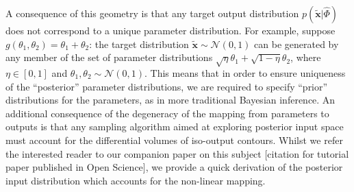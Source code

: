 \documentclass[10pt,letterpaper]{article}
\begin{document}
A consequence of this geometry is that any target output distribution $p(\tilde{\boldsymbol{x}}|\hat{\Phi})$ does not correspond to a unique parameter distribution. For example, suppose $g(\theta_1, \theta_2) = \theta_1 + \theta_2$: the target distribution $\tilde{\boldsymbol{x}}\sim \mathcal{N}(0, 1)$ can be generated by any member of the set of parameter distributions $\sqrt{\eta} \theta_1 + \sqrt{1 - \eta} \theta_2$, where $\eta\in [0, 1]$ and $\theta_1, \theta_2 \sim \mathcal{N}(0, 1)$. This means that in order to ensure uniqueness of the ``posterior'' parameter distributions, we are required to specify ``prior'' distributions for the parameters, as in more traditional Bayesian inference. An additional consequence of the degeneracy of the mapping from parameters to outputs is that any sampling algorithm aimed at exploring posterior input space must account for the differential volumes of iso-output contours. Whilst we refer the interested reader to our companion paper on this subject [citation for tutorial paper published in Open Science], we provide a quick derivation of the posterior input distribution which accounts for the non-linear mapping.
\end{document}
